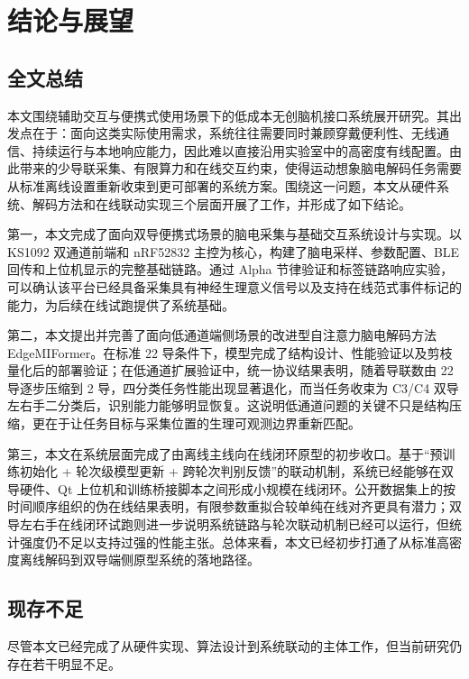 \chapter{结论与展望}
\label{cha:conclusion}

\section{全文总结}

本文围绕辅助交互与便携式使用场景下的低成本无创脑机接口系统展开研究。其出发点在于：面向这类实际使用需求，系统往往需要同时兼顾穿戴便利性、无线通信、持续运行与本地响应能力，因此难以直接沿用实验室中的高密度有线配置。由此带来的少导联采集、有限算力和在线交互约束，使得运动想象脑电解码任务需要从标准离线设置重新收束到更可部署的系统方案。围绕这一问题，本文从硬件系统、解码方法和在线联动实现三个层面开展了工作，并形成了如下结论。

第一，本文完成了面向双导便携式场景的脑电采集与基础交互系统设计与实现。以 KS1092 双通道前端和 nRF52832 主控为核心，构建了脑电采样、参数配置、BLE 回传和上位机显示的完整基础链路。通过 Alpha 节律验证和标签链路响应实验，可以确认该平台已经具备采集具有神经生理意义信号以及支持在线范式事件标记的能力，为后续在线试跑提供了系统基础。

第二，本文提出并完善了面向低通道端侧场景的改进型自注意力脑电解码方法 EdgeMIFormer。在标准 22 导条件下，模型完成了结构设计、性能验证以及剪枝量化后的部署验证；在低通道扩展验证中，统一协议结果表明，随着导联数由 22 导逐步压缩到 2 导，四分类任务性能出现显著退化，而当任务收束为 C3/C4 双导左右手二分类后，识别能力能够明显恢复。这说明低通道问题的关键不只是结构压缩，更在于让任务目标与采集位置的生理可观测边界重新匹配。

第三，本文在系统层面完成了由离线主线向在线闭环原型的初步收口。基于“预训练初始化 + 轮次级模型更新 + 跨轮次判别反馈”的联动机制，系统已经能够在双导硬件、Qt 上位机和训练桥接脚本之间形成小规模在线闭环。公开数据集上的按时间顺序组织的伪在线结果表明，有限参数重拟合较单纯在线对齐更具有潜力；双导左右手在线闭环试跑则进一步说明系统链路与轮次联动机制已经可以运行，但统计强度仍不足以支持过强的性能主张。总体来看，本文已经初步打通了从标准高密度离线解码到双导端侧原型系统的落地路径。

\section{现存不足}

尽管本文已经完成了从硬件实现、算法设计到系统联动的主体工作，但当前研究仍存在若干明显不足。

